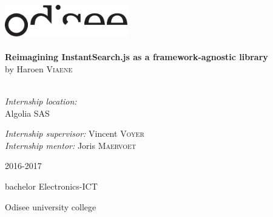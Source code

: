 \begin{titlepage}
\begin{center}
\includegraphics[width=0.4\textwidth]{./assets/logo.pdf}~\\[1cm]

\HRule \\[0.4cm]
{ \LARGE \bfseries Reimagining InstantSearch.js as a framework-agnostic library}\\[0.4cm]
{by Haroen \textsc{Viaene}}\\[0.2cm]

\HRule \\[1.5cm]

\begin{minipage}{0.49\textwidth}
\begin{flushleft} \large
\emph{Internship location:}\\
Algolia SAS\\

\end{flushleft}
\end{minipage}
\begin{minipage}{0.49\textwidth}
\begin{flushright} \large
\emph{Internship supervisor:}
Vincent \textsc{Voyer}\\
\emph{Internship mentor:}
Joris \textsc{Maervoet}\\
\end{flushright}
\end{minipage}

\vfill

{\large 2016-2017}

{\large{bachelor Electronics-ICT}}

{\large Odisee university college}

\end{center}
\end{titlepage}
